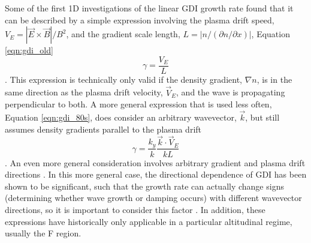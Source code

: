 Some of the first 1D investigations of the linear GDI growth rate found that it can be described by a simple expression involving the plasma drift speed, \(V_E = |\vec{E}\times\vec{B}|/B^2\), and the gradient scale length, \(L = |n/(\partial n/\partial x)|\), Equation \ref{eqn:gdi_old} \citep{Simon1963,Hoh1963,Linson1970}
\begin{equation}
	\label{eqn:gdi_old}
	\gamma = \frac{V_E}{L}
\end{equation}.
This expression is technically only valid if the density gradient, \(\nabla n\), is in the same direction as the plasma drift velocity, \(\vec{V}_E\), and the wave is propagating perpendicular to both.  A more general expression that is used less often, Equation \ref{eqn:gdi_80s}, does consider an arbitrary wavevector, \(\vec{k}\), but still assumes density gradients parallel to the plasma drift \citep{Tsunoda1988}
\begin{equation}
	\label{eqn:gdi_80s}
	\gamma = \frac{k_y}{k}\frac{\vec{k}\cdot\vec{V}_E}{kL}
\end{equation}.
An even more general consideration involves arbitrary gradient and plasma drift directions \citep{Kesknien1982,Makarevich2014c}.  In this more general case, the directional dependence of GDI has been shown to be significant, such that the growth rate can actually change signs (determining whether wave growth or damping occurs) with different wavevector directions, so it is important to consider this factor \citep{Makarevich2014c}.  In addition, these expressions have historically only applicable in a particular altitudinal regime, usually the F region.

